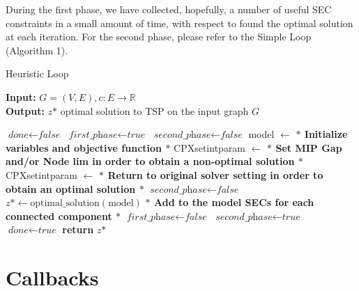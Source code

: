 During the first phase, we have collected, hopefully, a number of useful SEC constraints in a small amount of time, with respect to found the optimal solution at each iteration.
For the second phase, please refer to the Simple Loop (Algorithm 1).
\begin{algorithm}
    \caption{Heuristic Loop}\label{Loop Method}
    \hspace*{\algorithmicindent} \textbf{Input:} $G = (V,E) , c : E \rightarrow \mathbb{R}$\\
    \hspace*{\algorithmicindent} \textbf{Output:} $z \text{*} $ optimal solution to TSP on the input graph $G$
    \begin{algorithmic}[1]
    \State $\textit{done} \gets \textit{false}$
    \State $\textit{first\_phase} \gets \textit{true}$
    \State $\textit{second\_phase} \gets \textit{false}$
    \State model $ \leftarrow $ \textbf{$\ast$ Initialize variables and objective function $\ast$ }
    \State CPXsetintparam $ \leftarrow $ \textbf{$\ast$ Set MIP Gap and/or Node lim in order to obtain a non-optimal solution $\ast$ }
	\State CPXsetintparam $ \leftarrow $\textbf{ $\ast$ Return to original solver setting in order to obtain an optimal solution $\ast$ }
	\State $\textit{second\_phase} \gets \textit{false}$
	\EndIf
    	\State $z \text{*} \gets \text{optimal\_solution}(\text{model})$\;
	\State \textbf{ $\ast$ Add to the model SECs for each connected component $\ast$ }
	\EndIf
	\State $\textit{first\_phase} \gets \textit{false}$
	\State $\textit{second\_phase} \gets \textit{true}$
	\EndIf
	\State $\textit{done} \gets \textit{true}$
	\EndIf
    \EndWhile
    \State \textbf{return} $z \text{*} $
    \end{algorithmic}
    \end{algorithm}
    
\newpage
\section{Callbacks}

